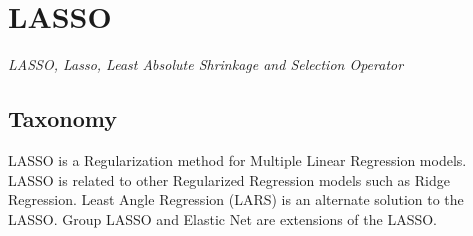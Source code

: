 
\section{LASSO} 
\label{sec:lasso}

\emph{LASSO, Lasso, Least Absolute Shrinkage and Selection Operator}

\subsection{Taxonomy}
LASSO is a Regularization method for Multiple Linear Regression models.
LASSO is related to other Regularized Regression models such as Ridge Regression.
Least Angle Regression (LARS) is an alternate solution to the LASSO.
Group LASSO and Elastic Net are extensions of the LASSO.


